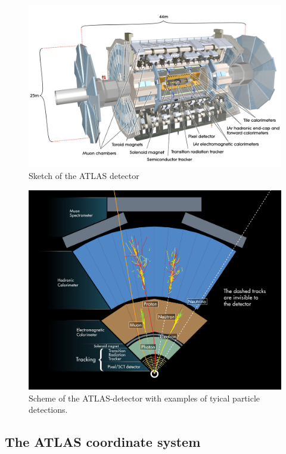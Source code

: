 \begin{figure}
  \centering
  \includegraphics[scale=0.15]{figures_LHC/atlas-detector}
  \caption{Sketch of the ATLAS detector\cite{Pequenao:1095924}}
  \label{fig:atlas}
\end{figure}



\begin{figure}
  \centering
  \includegraphics[scale=0.6]{figures_LHC/atlas-abstract}
  \caption[Scheme of the ATLAS-detector.]{Scheme of the ATLAS-detector with examples of tyical particle detections. \cite{Pequenao:1095924}}
  \label{fig:atlas_sketch}
\end{figure}

\subsection{The ATLAS coordinate system}

